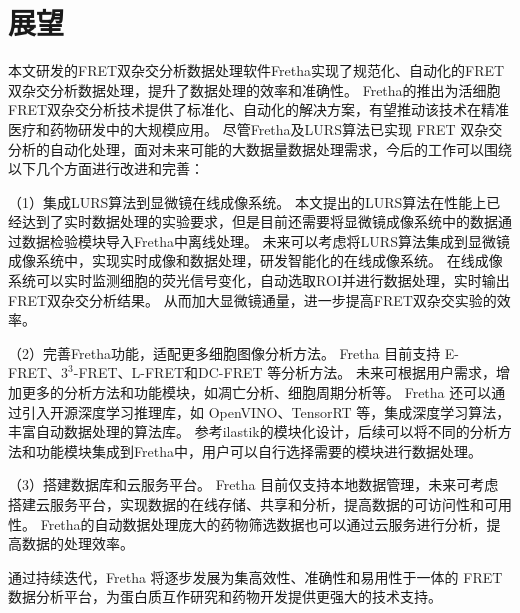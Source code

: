 \section{展望}
本文研发的FRET双杂交分析数据处理软件Fretha实现了规范化、自动化的FRET双杂交分析数据处理，提升了数据处理的效率和准确性。
Fretha的推出为活细胞FRET双杂交分析技术提供了标准化、自动化的解决方案，有望推动该技术在精准医疗和药物研发中的大规模应用。
尽管Fretha及LURS算法已实现 FRET 双杂交分析的自动化处理，面对未来可能的大数据量数据处理需求，今后的工作可以围绕以下几个方面进行改进和完善：

（1）集成LURS算法到显微镜在线成像系统。
本文提出的LURS算法在性能上已经达到了实时数据处理的实验要求，但是目前还需要将显微镜成像系统中的数据通过数据检验模块导入Fretha中离线处理。
未来可以考虑将LURS算法集成到显微镜成像系统中，实现实时成像和数据处理，研发智能化的在线成像系统。
在线成像系统可以实时监测细胞的荧光信号变化，自动选取ROI并进行数据处理，实时输出FRET双杂交分析结果。
从而加大显微镜通量，进一步提高FRET双杂交实验的效率。

（2）完善Fretha功能，适配更多细胞图像分析方法。
Fretha 目前支持 E-FRET、$3^3$-FRET、L-FRET和DC-FRET 等分析方法。
未来可根据用户需求，增加更多的分析方法和功能模块，如凋亡分析、细胞周期分析等。
Fretha 还可以通过引入开源深度学习推理库，如 OpenVINO、TensorRT 等，集成深度学习算法，丰富自动数据处理的算法库。
参考ilastik的模块化设计，后续可以将不同的分析方法和功能模块集成到Fretha中，用户可以自行选择需要的模块进行数据处理。

（3）搭建数据库和云服务平台。
Fretha 目前仅支持本地数据管理，未来可考虑搭建云服务平台，实现数据的在线存储、共享和分析，提高数据的可访问性和可用性。
Fretha的自动数据处理庞大的药物筛选数据也可以通过云服务进行分析，提高数据的处理效率。

通过持续迭代，Fretha 将逐步发展为集高效性、准确性和易用性于一体的 FRET 数据分析平台，为蛋白质互作研究和药物开发提供更强大的技术支持。